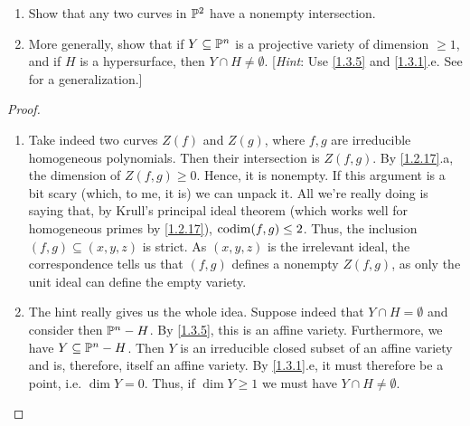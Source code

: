 \label{1.3.7}

\begin{enumerate}[label=(\alph*)]
    \item Show that any two curves in $\P^2$ have a nonempty intersection.

    \item More generally, show that if $Y \subseteq \P^n$ is a projective variety of dimension $\geq 1$, and if $H$ is a hypersurface, then $Y \cap H \neq \emptyset$. [\emph{Hint}: Use \ref{1.3.5} and \ref{1.3.1}.e. See \cite[I.7.2]{hartshorne} for a generalization.]
\end{enumerate}

\begin{proof}
    \begin{enumerate}[label = (\alph*)]
        \item Take indeed two curves $Z(f)$ and $Z(g)$, where $f, g$ are irreducible homogeneous polynomials. Then their intersection is $Z(f, g)$. By \ref{1.2.17}.a, the dimension of $Z(f, g) \geq 0$. Hence, it is nonempty. If this argument is a bit scary (which, to me, it is) we can unpack it. All we're really doing is saying that, by Krull's principal ideal theorem (which works well for homogeneous primes by \ref{1.2.17}), $\codim (f, g) \leq 2$. Thus, the inclusion $(f, g) \subseteq (x, y, z)$ is strict. As $(x, y, z)$ is the irrelevant ideal, the correspondence tells us that $(f, g)$ defines a nonempty $Z(f, g)$, as only the unit ideal can define the empty variety.

        \item The hint really gives us the whole idea. Suppose indeed that $Y \cap H =\emptyset$ and consider then $\P^n - H$. By \ref{1.3.5}, this is an affine variety. Furthermore, we have $Y \subseteq \P^n - H$. Then $Y$ is an irreducible closed subset of an affine variety and is, therefore, itself an affine variety. By \ref{1.3.1}.e, it must therefore be a point, i.e. $\dim Y = 0$. Thus, if $\dim Y \geq 1$ we must have $Y \cap H \neq \emptyset$.
    \end{enumerate}
\end{proof}
